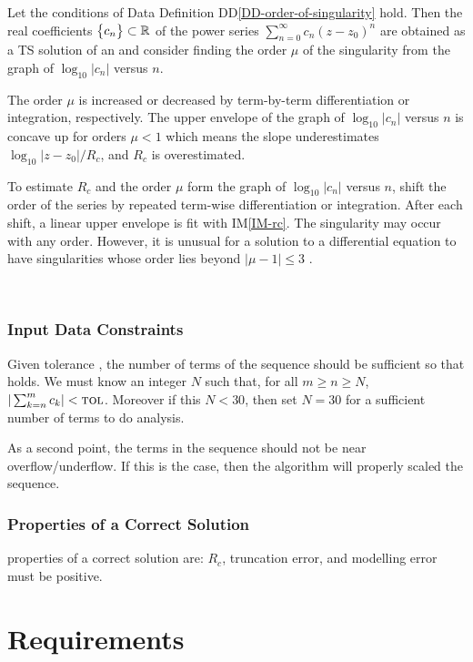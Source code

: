 \documentclass[12pt]{article}
\newcommand{\ddref}[1]{DD\ref{#1}}
\newcommand{\iref}[1]{IM\ref{#1}}
\begin{document}
Let the conditions of Data Definition \ddref{DD-order-of-singularity} hold.
Then the real coefficients $\bigl\{ {c_n} \bigr\} \subset \mathbb{R}$ of the power series
$\sum_{n=0}^{\infty} c_n (z-z_0)^n$ are obtained as a TS solution of an \ode and
consider finding the order $\mu$ of the singularity from the graph
of $\log_{10} | c_n |$ versus $n$.

The order $\mu$ is increased or decreased by term-by-term differentiation or
integration, respectively. The upper envelope of the graph of
$\log_{10} | c_n |$ versus $n$ is concave up for orders $\mu < 1$ which means
the slope underestimates $\log_{10} |z - z_0|/R_c$, and $R_c$ is overestimated.

To estimate $R_c$ and the order $\mu$ form the graph of $\log_{10} | c_n |$ versus $n$,
shift the order of the series by repeated term-wise differentiation or integration. After
each shift, a linear upper envelope is fit with \iref{IM-rc}. The singularity may occur with any order.
However, it is unusual for a solution to a differential equation to have singularities whose 
order lies beyond $| \mu - 1 | \leq 3$ \citep{chang1982}.

~\newline

\subsubsection{Input Data Constraints} \label{sec_DataConstraints}    

Given tolerance \tol, the number of terms of the sequence should be sufficient so that 
  holds. We must know an integer $N$ such that, for all $m \geq n \geq N$,
  $| \sum_{k=n}^{m} c_k | < \text{\sc tol}$. Moreover if this $N<30$, then set $N=30$ for a sufficient
  number of terms to do analysis.

As a second point, the terms in the sequence should not be near overflow/underflow. If this
is the case, then the algorithm will properly scaled the sequence.

\subsubsection{Properties of a Correct Solution} \label{sec_CorrectSolution}

 properties of a correct solution are: $R_c$, truncation error, and modelling error
must be positive.

\section{Requirements}\label{sc:requirements}
\end{document}
